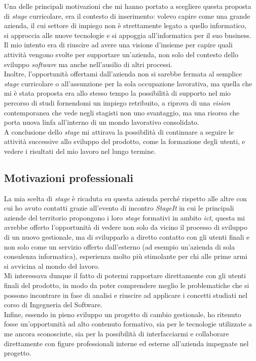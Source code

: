 Una delle principali motivazioni che mi hanno portato a scegliere questa proposta di \textit{stage} curricolare, era il contesto di inserimento: volevo capire come una grande azienda, il cui settore di impiego non è strettamente legato a quello informatico, si approccia alle nuove tecnologie e si appoggia all'informatica per il suo business. 
\\
Il mio intento era di riuscire ad avere una visione d'insieme per capire quali attività vengono svolte per supportare un'azienda, non solo del contesto dello sviluppo \textit{software} ma anche nell'ausilio di altri processi.
\\
Inoltre, l'opportunità offertami dall'azienda non si sarebbe fermata al semplice \textit{stage} curricolare o all'assunzione per la sola occupazione lavorativa, ma quella che mi è stata proposta era allo stesso tempo la possibilità di supporto nel mio percorso di studi fornendomi un impiego retribuito, a riprova di una \textit{vision} contemporanea che vede negli stagisti non uno svantaggio, ma una risorsa che porta nuova linfa all'interno di un mondo lavorativo consolidato.
\\
A conclusione dello \textit{stage} mi attirava la possibilità di continuare a seguire le attività successive allo sviluppo del prodotto, come la formazione degli utenti, e vedere i risultati del mio lavoro nel lungo termine.

\subsection{Motivazioni professionali}

La mia scelta di \textit{stage} è ricaduta su questa azienda perché rispetto alle altre con cui ho avuto contatti grazie all'evento di incontro \textit{StageIt} in cui le principali aziende del territorio propongono i loro \textit{stage} formativi in ambito \textit{\gls{ict}\glsfirstoccur}, questa mi avrebbe offerto l'opportunità di vedere non solo da vicino il processo di sviluppo di un nuovo gestionale, ma di svilupparlo a diretto contatto con gli utenti finali e non solo come un servizio offerto dall'esterno (ad esempio un'azienda di sola consulenza informatica), esperienza molto più stimolante per chi alle prime armi si avvicina al mondo del lavoro.
\\
Mi interessava dunque il fatto di potermi rapportare direttamente con gli utenti finali del prodotto, in modo da poter comprendere meglio le problematiche che si possono incontrare in fase di analisi e riuscire ad applicare i concetti studiati nel corso di Ingegneria del Software. 
\\ 
Infine, essendo in pieno sviluppo un progetto di cambio gestionale, ho ritenuto fosse un'opportunità ad alto contenuto formativo, sia per le tecnologie utilizzate a me ancora sconosciute, sia per la possibilità di interfacciarmi e collaborare direttamente con figure professionali interne ed esterne all'azienda impegnate nel progetto.
